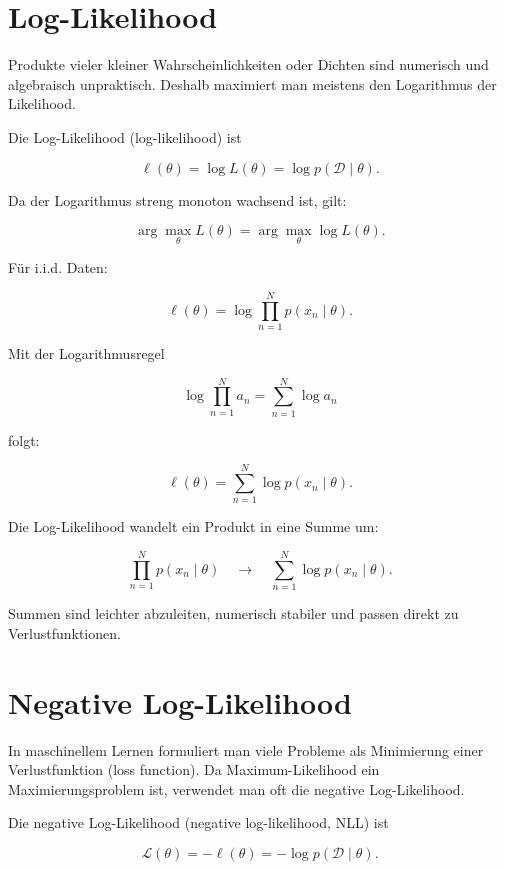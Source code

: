 \section{Log-Likelihood}

Produkte vieler kleiner Wahrscheinlichkeiten oder Dichten sind numerisch und algebraisch unpraktisch.
Deshalb maximiert man meistens den Logarithmus der Likelihood.

\begin{definitionbox}
Die Log-Likelihood (log-likelihood) ist

\[
    \ell(\theta)
    =
    \log L(\theta)
    =
    \log p(\mathcal{D} \mid \theta).
\]
\end{definitionbox}

Da der Logarithmus streng monoton wachsend ist, gilt:

\[
    \arg\max_{\theta}
    L(\theta)
    =
    \arg\max_{\theta}
    \log L(\theta).
\]

Für i.i.d. Daten:

\[
    \ell(\theta)
    =
    \log
    \prod_{n=1}^{N}
    p(x_n \mid \theta).
\]

Mit der Logarithmusregel

\[
    \log \prod_{n=1}^{N} a_n
    =
    \sum_{n=1}^{N} \log a_n
\]

folgt:

\[
    \ell(\theta)
    =
    \sum_{n=1}^{N}
    \log p(x_n \mid \theta).
\]

\begin{conceptbox}
Die Log-Likelihood wandelt ein Produkt in eine Summe um:

\[
    \prod_{n=1}^{N}
    p(x_n \mid \theta)
    \quad
    \longrightarrow
    \quad
    \sum_{n=1}^{N}
    \log p(x_n \mid \theta).
\]

Summen sind leichter abzuleiten, numerisch stabiler und passen direkt zu Verlustfunktionen.
\end{conceptbox}

\section{Negative Log-Likelihood}

In maschinellem Lernen formuliert man viele Probleme als Minimierung einer Verlustfunktion (loss function).
Da Maximum-Likelihood ein Maximierungsproblem ist, verwendet man oft die negative Log-Likelihood.

\begin{definitionbox}
Die negative Log-Likelihood (negative log-likelihood, NLL) ist

\[
    \mathcal{L}(\theta)
    =
    -\ell(\theta)
    =
    -\log p(\mathcal{D} \mid \theta).
\]
\end{definitionbox}


